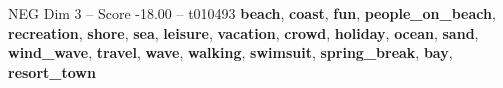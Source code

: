 \begin{textsample}{NEG Dim 3 – Score -18.00 – t010493}  \label{ex:f3_neg_019}
\textbf{beach}, \textbf{coast}, \textbf{fun}, \textbf{people\_on\_beach}, \textbf{recreation}, \textbf{shore}, \textbf{sea}, \textbf{leisure}, \textbf{vacation}, \textbf{crowd}, \textbf{holiday}, \textbf{ocean}, \textbf{sand}, \textbf{wind\_wave}, \textbf{travel}, \textbf{wave}, \textbf{walking}, \textbf{swimsuit}, \textbf{spring\_break}, \textbf{bay}, \textbf{resort\_town}

\end{textsample}
